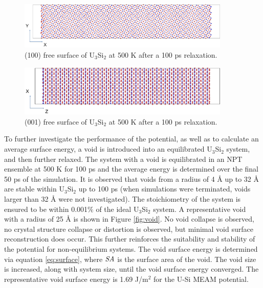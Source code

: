 \documentclass[review]{elsarticle}
\begin{document}
\begin{figure}[bt]
	\centering
	\includegraphics[width=0.9\textwidth]{100KK1a.png}
    \caption{(100) free surface of U$_{3}$Si$_{2}$ at 500 K after a 100 ps relaxation.}\label{fig:ben7}
\end{figure}

\begin{figure}[bt]
	\centering
	\includegraphics[width=0.9\textwidth]{001KK1a.png}
    \caption{(001) free surface of U$_{3}$Si$_{2}$ at 500 K after a 100 ps relaxation. }\label{fig:ben8}
\end{figure}

\FloatBarrier

To further investigate the performance of the potential, as well as to calculate an average surface energy, a void is introduced into an equilibrated U$_{3}$Si$_{2}$ system, and then further relaxed.  The system with a void is equilibrated in an NPT ensemble at 500 K for 100 ps and the average energy is determined over the final 50 ps of the simulation.  It is observed that voids from a radius of 4 {\AA} up to 32 {\AA} are stable within U$_{3}$Si$_{2}$ up to 100 ps (when simulations were terminated, voids larger than 32 {\AA} were not investigated).   The stoichiometry of the system is ensured to be within 0.001$\%$ of the ideal U$_{3}$Si$_{2}$ system.  A representative void with a radius of 25 {\AA} is shown in Figure \ref{fig:void}.  No void collapse is observed, no crystal structure collapse or distortion is observed, but minimal void surface reconstruction does occur.  This further reinforces the suitability and stability of the potential for non-equilibrium systems.  The void surface energy is determined via equation \ref{eq:surface}, where $\it{SA}$ is the surface area of the void.  The void size is increased, along with system size, until the void surface energy converged.  The representative void surface energy is 1.69 J/m$^{2}$ for the U-Si MEAM potential.
\end{document}
